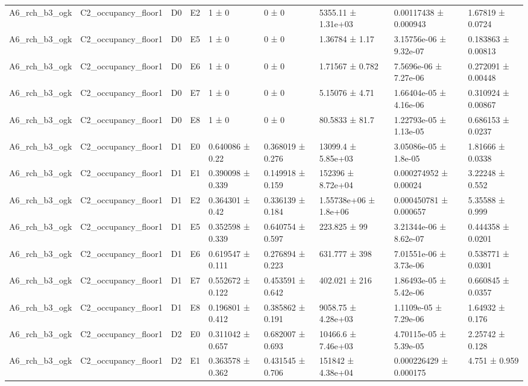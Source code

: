 \begin{table}
\begin{tabular}{lllllllll}
A6\_rch\_b3\_ogk & C2\_occupancy\_floor1 & D0 & E2 & 1 ± 0 & 0 ± 0 & 5355.11 ± 1.31e+03 & 0.00117438 ± 0.000943 & 1.67819 ± 0.0724 \\
A6\_rch\_b3\_ogk & C2\_occupancy\_floor1 & D0 & E5 & 1 ± 0 & 0 ± 0 & 1.36784 ± 1.17 & 3.15756e-06 ± 9.32e-07 & 0.183863 ± 0.00813 \\
A6\_rch\_b3\_ogk & C2\_occupancy\_floor1 & D0 & E6 & 1 ± 0 & 0 ± 0 & 1.71567 ± 0.782 & 7.5696e-06 ± 7.27e-06 & 0.272091 ± 0.00448 \\
A6\_rch\_b3\_ogk & C2\_occupancy\_floor1 & D0 & E7 & 1 ± 0 & 0 ± 0 & 5.15076 ± 4.71 & 1.66404e-05 ± 4.16e-06 & 0.310924 ± 0.00867 \\
A6\_rch\_b3\_ogk & C2\_occupancy\_floor1 & D0 & E8 & 1 ± 0 & 0 ± 0 & 80.5833 ± 81.7 & 1.22793e-05 ± 1.13e-05 & 0.686153 ± 0.0237 \\
A6\_rch\_b3\_ogk & C2\_occupancy\_floor1 & D1 & E0 & 0.640086 ± 0.22 & 0.368019 ± 0.276 & 13099.4 ± 5.85e+03 & 3.05086e-05 ± 1.8e-05 & 1.81666 ± 0.0338 \\
A6\_rch\_b3\_ogk & C2\_occupancy\_floor1 & D1 & E1 & 0.390098 ± 0.339 & 0.149918 ± 0.159 & 152396 ± 8.72e+04 & 0.000274952 ± 0.00024 & 3.22248 ± 0.552 \\
A6\_rch\_b3\_ogk & C2\_occupancy\_floor1 & D1 & E2 & 0.364301 ± 0.42 & 0.336139 ± 0.184 & 1.55738e+06 ± 1.8e+06 & 0.000450781 ± 0.000657 & 5.35588 ± 0.999 \\
A6\_rch\_b3\_ogk & C2\_occupancy\_floor1 & D1 & E5 & 0.352598 ± 0.339 & 0.640754 ± 0.597 & 223.825 ± 99 & 3.21344e-06 ± 8.62e-07 & 0.444358 ± 0.0201 \\
A6\_rch\_b3\_ogk & C2\_occupancy\_floor1 & D1 & E6 & 0.619547 ± 0.111 & 0.276894 ± 0.223 & 631.777 ± 398 & 7.01551e-06 ± 3.73e-06 & 0.538771 ± 0.0301 \\
A6\_rch\_b3\_ogk & C2\_occupancy\_floor1 & D1 & E7 & 0.552672 ± 0.122 & 0.453591 ± 0.642 & 402.021 ± 216 & 1.86493e-05 ± 5.42e-06 & 0.660845 ± 0.0357 \\
A6\_rch\_b3\_ogk & C2\_occupancy\_floor1 & D1 & E8 & 0.196801 ± 0.412 & 0.385862 ± 0.191 & 9058.75 ± 4.28e+03 & 1.1109e-05 ± 7.29e-06 & 1.64932 ± 0.176 \\
A6\_rch\_b3\_ogk & C2\_occupancy\_floor1 & D2 & E0 & 0.311042 ± 0.657 & 0.682007 ± 0.693 & 10466.6 ± 7.46e+03 & 4.70115e-05 ± 5.39e-05 & 2.25742 ± 0.128 \\
A6\_rch\_b3\_ogk & C2\_occupancy\_floor1 & D2 & E1 & 0.363578 ± 0.362 & 0.431545 ± 0.706 & 151842 ± 4.38e+04 & 0.000226429 ± 0.000175 & 4.751 ± 0.959 \\

\end{tabular}
\end{table}
